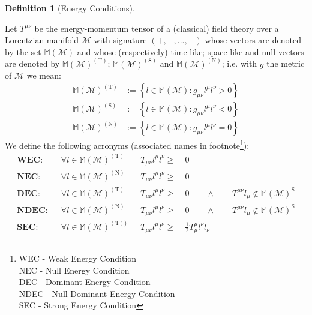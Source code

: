 \documentclass[a4paper,11pt]{article}
\numberwithin{equation}{section}
\theoremstyle{definition}
\newtheorem{definition}{Definition}
\begin{document}
\begin{definition}[Energy Conditions]$\quad$

    Let $T^{\mu\nu}$ be the energy-momentum tensor of a (classical) field theory over a Lorentzian manifold $\mathcal{M}$ with signature $(+,-,...,-)$ whose vectors are denoted by the set $\mathbb{M}(\mathcal{M})$ and whose (respectively) time-like; space-like and null vectors are denoted by  $\mathbb{M}(\mathcal{M})^{(\mathrm{T})}$; $\mathbb{M}(\mathcal{M})^{(\mathrm{S})}$ and $\mathbb{M}(\mathcal{M})^{(\mathrm{N})}$; i.e. with $g$ the metric of $\mathcal{M}$ we mean:
    \begin{align*}
        \mathbb{M}(\mathcal{M})^{(\mathrm{T})}&:=\left\{l\in\mathbb{M}(\mathcal{M}):g_{\mu\nu}l^\mu l^\nu>0\right\}\\
        \mathbb{M}(\mathcal{M})^{(\mathrm{S})}&:=\left\{l\in\mathbb{M}(\mathcal{M}):g_{\mu\nu}l^\mu l^\nu<0\right\}\\
        \mathbb{M}(\mathcal{M})^{(\mathrm{N})}&:=\left\{l\in\mathbb{M}(\mathcal{M}):g_{\mu\nu}l^\mu l^\nu=0\right\}
    \end{align*}
We define the following acronyms (associated names in footnote\footnote{WEC - Weak Energy Condition\\NEC - Null Energy Condition\\DEC - Dominant Energy Condition\\NDEC - Null Dominant Energy Condition\\SEC - Strong Energy Condition}):
\begin{align*}
\textbf{WEC}: && \forall l \in \mathbb{M}(\mathcal{M})^{(\mathrm{T})} && T_{\mu\nu}l^\mu l^\nu\geq \;& 0\\
\textbf{NEC}: && \forall l \in \mathbb{M}(\mathcal{M})^{(\mathrm{N})} && T_{\mu\nu}l^\mu l^\nu\geq \;& 0\\
\textbf{DEC}: && \forall l \in \mathbb{M}(\mathcal{M})^{(\mathrm{T})} && T_{\mu\nu}l^\mu l^\nu\geq \;& 0 \quad \quad \wedge \quad \quad T^{\mu\nu}l_\mu \notin\mathbb{M}(\mathcal{M})^{\mathrm{S}}\\
\textbf{NDEC}: && \forall l \in \mathbb{M}(\mathcal{M})^{(\mathrm{N})} && T_{\mu\nu}l^\mu l^\nu\geq \;& 0 \quad \quad \wedge \quad \quad T^{\mu\nu}l_\mu \notin\mathbb{M}(\mathcal{M})^{\mathrm{S}}\\
\textbf{SEC}: && \forall l \in \mathbb{M}(\mathcal{M})^{(\mathrm{T}))} && T_{\mu\nu}l^\mu l^\nu\geq \;& \frac{1}{2}T^\mu_\mu l^\nu l_\nu
\end{align*}
\end{definition}
\end{document}
